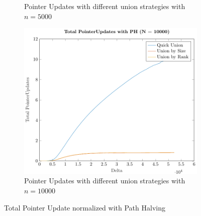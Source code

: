 \begin{figure}[ht]
\begin{subfigure}{0.32\textwidth}
        \caption{Pointer Updates with different union strategies with $n = 5000$}
    \end{subfigure}%
    \hfill
    \begin{subfigure}{0.32\textwidth}
        \centering
        \includegraphics[width=\textwidth]{../images/plotPHFull10000_PointerUpdates.pdf}
        \caption{Pointer Updates with different union strategies with $n = 10000$}
    \end{subfigure}

    \caption{Total Pointer Update normalized with Path Halving}
    \label{fig:tpuPH}
\end{figure}


